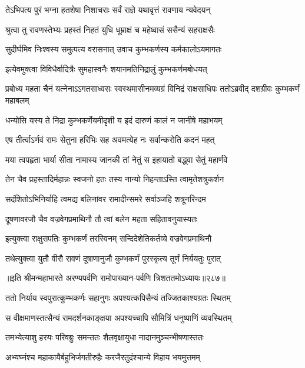\twolineshloka
{तेऽभिपत्य पुरं भग्ना हतशेषा निशाचराः}
{सर्वं राज्ञे यथावृत्तं रावणाय न्यवेदयन्}


\twolineshloka
{श्रुत्वा तु रावणस्तेभ्यः प्रहस्तं निहतं युधि}
{धूम्राक्षं च महेष्वासं ससैन्यं सहराक्षसैः}


\twolineshloka
{सुदीर्घमिव निःश्वस्य समुत्पत्य वरासनात्}
{उवाच कुम्भकर्णस्य कर्मकालोऽयमागतः}


\twolineshloka
{इत्येवमुक्त्वा विविधैर्वादित्रैः सुमहास्वनैः}
{शयानमतिनिद्रालुं कुम्भकर्णमबोधयत्}


\threelineshloka
{प्रबोध्य महता चैनं यत्नेनाऽऽगतसाध्वसः}
{स्वस्थमासीनमव्यग्रं विनिद्रं राक्षसाधिपः}
{ततोऽब्रवीद् दशग्रीवः कुम्भकर्णं महाबलम्}


\twolineshloka
{धन्योसि यस्य ते निद्रा कुम्भकर्णेयमीदृशी}
{य इदं दारुणं कालं न जानीषे महाभयम्}


\twolineshloka
{एष तीर्त्वाऽर्णवं रामः सेतुना हरिभिः सह}
{अवमत्येह नः सर्वान्करोति कदनं महत्}


\twolineshloka
{मया त्वपहृता भार्या सीता नामास्य जानकी}
{तां नेतुं स इहायातो बद्ध्वा सेतुं महार्णवे}


\twolineshloka
{तेन चैव प्रहस्तादिर्महान्नः स्वजनो हतः}
{तस्य नान्यो निहन्ताऽस्ति त्वामृतेशत्रुकर्शन}


\twolineshloka
{सदंशितोऽभिनिर्याहि त्वमद्य बलिनांवर}
{रामादीन्समरे सर्वाञ्जहि शत्रूनरिन्दम}


\twolineshloka
{दूषणावरजौ चैव वज्रवेगप्रमाथिनौ}
{तौ त्वां बलेन महता सहितावनुयास्यतः}


\twolineshloka
{इत्युक्त्वा राक्षुसपतिः कुम्भकर्णं तरस्विनम्}
{सन्दिदेशेतिकर्तव्ये वज्रवेगप्रमाथिनौ}


\twolineshloka
{तथेत्युक्त्वा युतौ वीरौ रावणं दूषाणानुजौ}
{कुम्भकर्णं पुरस्कृत्य तूर्णं निर्ययतुः पुरात्}


॥इति श्रीमन्महाभारते अरण्यपर्वणि रामोपाख्यान-पर्वणि त्रिशततमोऽध्यायः॥२८७॥

\storymeta

\resetShloka



\twolineshloka
{ततो निर्याय स्वपुरात्कुम्भकर्णः सहानुगः}
{अपश्यत्कपिसैन्यं तज्जितकाश्यग्रतः स्थितम्}


\twolineshloka
{स वीक्षमाणस्तत्सैन्यं रामदर्शनकाङ्क्षया}
{अपश्यच्चापि सौमित्रिं धनुष्पाणिं व्यवस्थितम्}


\twolineshloka
{तमभ्येत्याशु हरयः परिवब्रुः समन्ततः}
{शैलवृक्षायुधा नादानमुञ्चन्भीषणास्ततः}


\twolineshloka
{अभ्यघ्नंश्च महाकायैर्बहुभिर्जगतीरुहैः}
{करजैरतुदंश्चान्ये विहाय भयमुत्तमम्}


